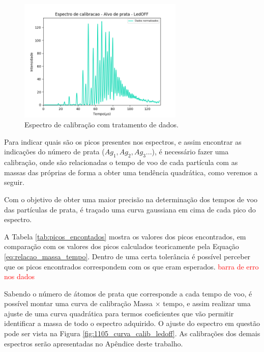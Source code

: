 \begin{figure}
  \centering  
  \includegraphics[width=0.7\textwidth]{graficos_resultados/0105_LEDOFF_normalizado_mcp.png}
  \caption{Espectro de calibração com tratamento de dados.}
  \label{fig:0105_ledoff_dados_tratados} 
\end{figure}

Para indicar quais são os picos presentes nos espectros, e assim encontrar as indicações do número de prata ($Ag_{1},Ag_{2},Ag_{3}...$), é necessário fazer uma calibração, onde são relacionadas o tempo de voo de cada partícula com as massas das próprias de forma a obter uma tendência quadrática, como veremos a seguir.

Com o objetivo de obter uma maior precisão na determinação dos tempos de voo das partículas de prata, é traçado uma curva gaussiana em cima de cada pico do espectro.

A Tabela \ref{tab:picos_encontados} mostra os valores dos picos encontrados, em comparação com os valores dos picos calculados teoricamente pela Equação \ref{eq:relacao_massa_tempo}. Dentro de uma certa tolerância é possível perceber que os picos encontrados correspondem com os que eram esperados. \textcolor{red}{barra de erro nos dados}

Sabendo o número de átomos de prata que corresponde a cada tempo de voo, é possível montar uma curva de calibração Massa $\times$ tempo, e assim realizar uma ajuste de uma curva quadrática para termos coeficientes que vão permitir identificar a massa de todo o espectro adquirido. O ajuste do espectro em questão pode ser vista na Figura \ref{fig:1105_curva_calib_ledoff}. As calibrações dos demais espectros serão apresentadas no Apêndice deste trabalho.

